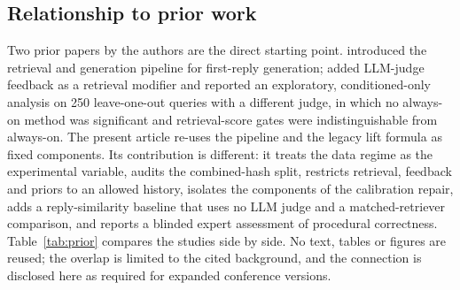 \documentclass{ieeeaccess}
\begin{document}
\subsection{Relationship to prior work}
\label{sec:prior}
Two prior papers by the authors are the direct starting point. \cite{b31}
introduced the retrieval and generation pipeline for first-reply generation;
\cite{b32} added LLM-judge feedback as a retrieval modifier and reported an
exploratory, conditioned-only analysis on 250 leave-one-out queries with a
different judge, in which no always-on method was significant and retrieval-score
gates were indistinguishable from always-on. The present article re-uses the
pipeline and the legacy lift formula as fixed components. Its contribution is
different: it treats the data regime as the experimental variable, audits the
combined-hash split, restricts retrieval, feedback and priors to an allowed history,
isolates the components of the calibration repair, adds a reply-similarity
baseline that uses no LLM judge and a matched-retriever comparison, and reports a blinded expert
assessment of procedural correctness. Table~\ref{tab:prior} compares the studies
side by side. No text, tables or figures are reused; the overlap is limited to the
cited background, and the connection is disclosed here as required for expanded
conference versions.
\end{document}
